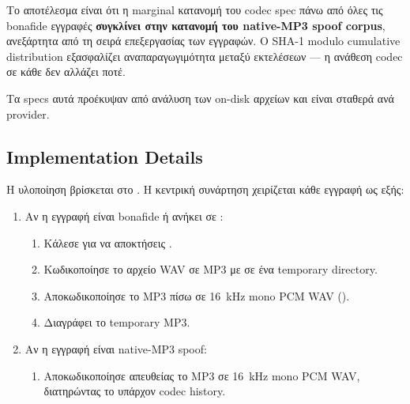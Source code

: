 Το αποτέλεσμα είναι ότι η marginal κατανομή του codec spec
πάνω από όλες τις bonafide εγγραφές
\textbf{συγκλίνει στην κατανομή του native-MP3 spoof corpus},
ανεξάρτητα από τη σειρά επεξεργασίας των εγγραφών.
Ο SHA-1 modulo cumulative distribution εξασφαλίζει
αναπαραγωγιμότητα μεταξύ εκτελέσεων —
η ανάθεση codec σε κάθε  δεν αλλάζει ποτέ.

Τα specs αυτά προέκυψαν από  ανάλυση των on-disk αρχείων
και είναι σταθερά ανά provider.

\subsection{Implementation Details}
\label{subsec:implementation-details}

Η υλοποίηση βρίσκεται στο .
Η κεντρική συνάρτηση  χειρίζεται κάθε εγγραφή ως εξής:

\begin{english}
\begin{enumerate}
  \item Αν η εγγραφή είναι bonafide ή ανήκει σε :
    \begin{enumerate}
      \item Κάλεσε  για να αποκτήσεις
            .
      \item Κωδικοποίησε το αρχείο WAV σε MP3 με
            σε ένα temporary directory.
      \item Αποκωδικοποίησε το MP3 πίσω σε 16~kHz mono PCM WAV
            ().
      \item Διαγράφει το temporary MP3.
    \end{enumerate}
  \item Αν η εγγραφή είναι native-MP3 spoof:
    \begin{enumerate}
      \item Αποκωδικοποίησε απευθείας το MP3 σε 16~kHz mono PCM WAV,
            διατηρώντας το υπάρχον codec history.
    \end{enumerate}
\end{enumerate}
\end{english}

